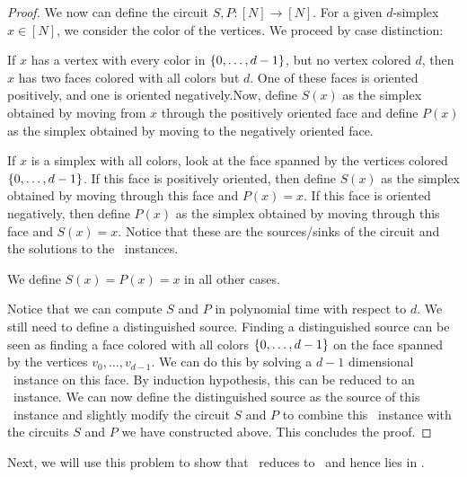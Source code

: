 \begin{proof}
	We now can define the circuit $S, P : [N] \rightarrow [N]$. For a given $d$-simplex $x \in [N]$, we consider the color of the vertices. We proceed by case distinction:
	\begin{case}{1}
		If $x$ has a vertex with every color in $\left\{0, \dots, d-1\right\}$, but no vertex colored $d$, then $x$ has two faces colored with all colors but $d$. One of these faces is oriented positively, and one is oriented negatively.Now, define $S(x)$ as the simplex obtained by moving from $x$ through the positively oriented face and define $P(x)$ as the simplex obtained by moving to the negatively oriented face.
	\end{case}
	\begin{case}{2}
		If $x$ is a simplex with all colors, look at the face spanned by the vertices colored $\left\{0, \dots, d-1\right\}$. If this face is positively oriented, then define $S(x)$ as the simplex obtained by moving through this face and $P(x) = x$. If this face is oriented negatively, then define $P(x)$ as the simplex obtained by moving through this face and $S(x) = x$. Notice that these are the sources/sinks of the circuit and the solutions to the \Sperner\ instances.
	\end{case}
	\begin{case}{3}
		We define $S(x) = P(x) = x$ in all other cases.
	\end{case}
	Notice that we can compute $S$ and $P$ in polynomial time with respect to $d$. We still need to define a distinguished source. Finding a distinguished source can be seen as finding a face colored with all colors $\left\{0, \dots, d-1\right\}$ on the face spanned by the vertices $v_0, \dots, v_{d-1}$. We can do this by solving a $d-1$ dimensional \Sperner\ instance on this face. By induction hypothesis, this can be reduced to an \EndOfLine\ instance. We can now define the distinguished source as the source of this \EndOfLine\ instance and slightly modify the circuit $S$ and $P$ to combine this \EndOfLine\ instance with the circuits $S$ and $P$ we have constructed above. This concludes the proof.
\end{proof}

Next, we will use this problem to show that \Tarskistar\ reduces to \Sperner\ and hence lies in \PPAD\@.

